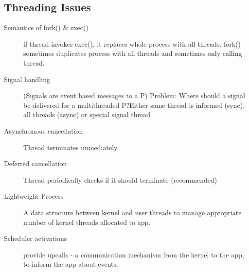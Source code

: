 \subsection*{Threading Issues}
\begin{description}
\item[Semantics of fork() \& exec()] if thread invokes exec(), it replaces whole process with all threads. fork() sometimes duplicates process with all threads and sometimes only calling thread.
  \item[Signal handling] (Signals are event based messages to a P) Problem: Where should a signal be delivered for a multithreaded P?Either same thread is informed (sync), all threads (async) or special signal thread
  \item[Asynchronous cancellation] Thread terminates immediately
  \item[Deferred cancellation] Thread periodically checks if it should terminate (recommended)
  \item[Lightweight Process] A data structure between kernel and user threads to manage appropriate number of kernel threads allocated to app.
  \item[Scheduler activations] provide upcalls - a communication mechanism from the kernel to the app, to inform the app about events.
\end{description}

